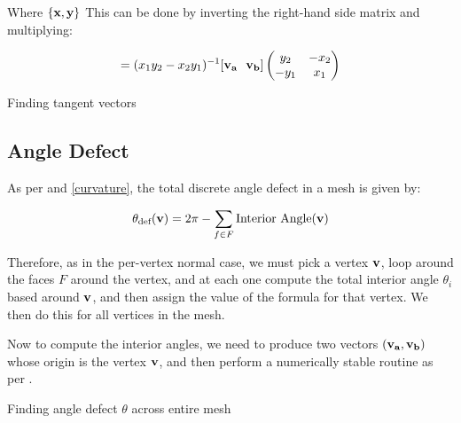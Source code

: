 Where $\{\bf{x, y}\}$
This can be done by inverting the right-hand side matrix and multiplying:

\begin{align*}
    [\bf{t  \ \ b}] = (x_1 y_2 - x_2 y_1)^{-1} [\bf{v_a \ \ v_b}]
\begin{pmatrix}
 y_2 & -x_2 \\
 -y_1  & x_1
\end{pmatrix}
\end{align*}



\begin{algorithm}
\caption{Finding tangent vectors}
\begin{algorithmic}[1]

\EndProcedure
\end{algorithmic}
\end{algorithm}

\subsection{Angle Defect} \label{angle-defect-algorithm}

As per \cite{discreteexterior1} and \ref{curvature}, the
total discrete angle defect in a mesh is given by:

\begin{align*}
    \theta_{\text{def}}(\bf{v}) = 2\pi - \sum_{f \in F}
    \text{Interior Angle}(\bf{v})
\end{align*}

Therefore, as in the per-vertex normal case, we must pick a vertex 
$\bf{v}$, loop around the faces $F$ around the vertex, and at each one
compute the total interior angle $\theta_i$ based around $\bf{v}$,
and then assign the value of the formula for that vertex.
We then do this for all vertices in the mesh.

\spa

Now to compute the interior angles, we need to produce
two vectors $\bf{(v_a,v_b)}$ whose origin is the
vertex $\bf{v}$, and then perform a numerically stable
routine as per \cite{float3}.


\begin{algorithm}
\caption{Finding angle defect $\theta$ across entire mesh}
\begin{algorithmic}[1]


\EndProcedure
\end{algorithmic}
\end{algorithm}

